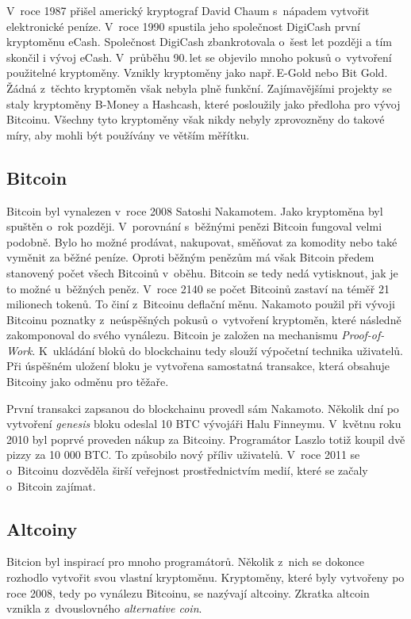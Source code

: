 \documentclass[12pt]{report}			%
\begin{document}
{{V~roce 1987 přišel americký kryptograf David Chaum s~nápadem vytvořit elektronické peníze. V~roce 1990 spustila jeho společnost DigiCash první kryptoměnu eCash. Společnost DigiCash zbankrotovala o~šest let později a tím skončil i vývoj eCash. V~průběhu 90.\,let se objevilo mnoho pokusů o~vytvoření použitelné kryptoměny. Vznikly kryptoměny jako např.\,E-Gold nebo Bit Gold. Žádná z~těchto kryptoměn však nebyla plně funkční. Zajímavějšími projekty se staly kryptoměny B-Money a Hashcash, které posloužily jako předloha pro vývoj Bitcoinu. Všechny tyto kryptoměny však nikdy nebyly zprovozněny do takové míry, aby mohli být používány ve větším měřítku. \cite{Reiff2022}
		}
		\subsection{Bitcoin}{
Bitcoin byl vynalezen v~roce 2008 Satoshi Nakamotem. Jako kryptoměna byl spuštěn o~rok později. V~porovnání s~běžnými penězi Bitcoin fungoval velmi podobně. Bylo ho možné prodávat, nakupovat, směňovat za komodity nebo také vyměnit za běžné peníze. Oproti běžným penězům má však Bitcoin předem stanovený počet všech Bitcoinů v~oběhu. Bitcoin se tedy nedá vytisknout, jak je to možné u~běžných peněz. V~roce 2140 se počet Bitcoinů zastaví na téměř 21 milionech tokenů. To činí z~Bitcoinu deflační měnu. Nakamoto použil při vývoji Bitcoinu poznatky z~neúspěšných pokusů o~vytvoření kryptoměn, které následně zakomponoval do svého vynálezu. Bitcoin je založen na mechanismu \textit{Proof-of-Work}. K~ukládání bloků do blockchainu tedy slouží výpočetní technika uživatelů. Při úspěšném uložení bloku je vytvořena samostatná transakce, která obsahuje Bitcoiny jako odměnu pro těžaře.  \cite{Antonopoulos2017}\cite{Nakamoto2008}

První transakci zapsanou do blockchainu provedl sám Nakamoto. Několik dní po vytvoření \textit{genesis} bloku odeslal 10 BTC vývojáři Halu Finneymu. V~květnu roku 2010 byl poprvé proveden nákup za Bitcoiny. Programátor Laszlo totiž koupil dvě pizzy za 10 000 BTC. To způsobilo nový příliv uživatelů. V~roce 2011 se o~Bitcoinu dozvěděla širší veřejnost prostřednictvím medií, které se začaly o~Bitcoin zajímat. \cite{Stroukal2021} 
}
		\subsection{Altcoiny}{
Bitcion byl inspirací pro mnoho programátorů. Několik z~nich se dokonce rozhodlo vytvořit svou vlastní kryptoměnu. Kryptoměny, které byly vytvořeny po roce 2008, tedy po vynálezu Bitcoinu, se nazývají altcoiny. Zkratka altcoin vznikla z~dvouslovného \textit{alternative coin}. 

}}
\end{document}
